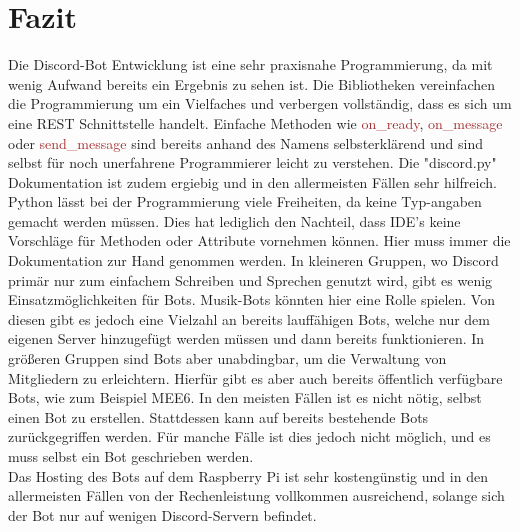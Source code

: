 \documentclass[sigplan,screen]{acmart}
\begin{document}
\section{Fazit}
Die Discord-Bot Entwicklung ist eine sehr praxisnahe Programmierung, da mit wenig Aufwand bereits ein Ergebnis zu sehen ist. Die Bibliotheken vereinfachen die Programmierung um ein Vielfaches und verbergen vollständig, dass es sich um eine REST Schnittstelle handelt. Einfache Methoden wie \textcolor{brown}{on\_ready},  \textcolor{brown}{on\_message} oder \textcolor{brown}{send\_message} sind bereits anhand des Namens selbsterklärend und sind selbst für noch unerfahrene Programmierer leicht zu verstehen. Die "discord.py" Dokumentation ist zudem ergiebig und in den allermeisten Fällen sehr hilfreich. \\
\noindent Python lässt bei der Programmierung viele Freiheiten, da keine Typ-angaben gemacht werden müssen. Dies hat lediglich den Nachteil, dass IDE's keine Vorschläge für Methoden oder Attribute vornehmen können. Hier muss immer die Dokumentation zur Hand genommen werden. In kleineren Gruppen, wo Discord primär nur zum einfachem Schreiben und Sprechen genutzt wird, gibt es wenig Einsatzmöglichkeiten für Bots. Musik-Bots könnten hier eine Rolle spielen. Von diesen gibt es jedoch eine Vielzahl an bereits lauffähigen Bots, welche nur dem eigenen Server hinzugefügt werden müssen und dann bereits funktionieren. In größeren Gruppen sind Bots aber unabdingbar, um die Verwaltung von Mitgliedern zu erleichtern. Hierfür gibt es aber auch bereits öffentlich verfügbare Bots, wie zum Beispiel MEE6. \cite{mee6} In den meisten Fällen ist es nicht nötig, selbst einen Bot zu erstellen. Stattdessen kann auf bereits bestehende Bots zurückgegriffen werden. Für manche Fälle ist dies jedoch nicht möglich, und es muss selbst ein Bot geschrieben werden. \\
\noindent Das Hosting des Bots auf dem Raspberry Pi ist sehr kostengünstig und in den allermeisten Fällen von der Rechenleistung vollkommen ausreichend, solange sich der Bot nur auf wenigen Discord-Servern befindet. 

\newpage



\end{document}
